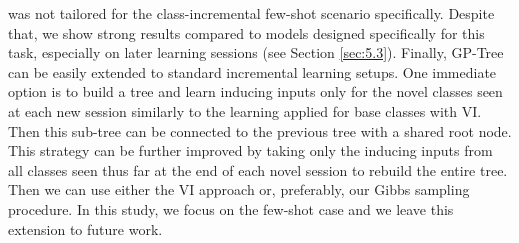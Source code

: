 \documentclass[preprint,11pt]{elsarticle}
\begin{document}
        was not tailored for the class-incremental few-shot scenario
        specifically. Despite that, we show strong results compared
        to models designed specifically for this task, especially on
        later learning sessions (see Section \ref{sec:5.3}). Finally, GP-Tree
        can be easily extended to standard incremental learning
        setups. One immediate option is to build a tree and learn
        inducing inputs only for the novel classes seen at each new
        session similarly to the learning applied for base classes
        with VI. Then this sub-tree can be connected to the previous
        tree with a shared root node. This strategy can be further
        improved by taking only the inducing inputs from all classes
        seen thus far at the end of each novel session to rebuild the
        entire tree. Then we can use either the VI approach or,
        preferably, our Gibbs sampling procedure. In this study, we
        focus on the few-shot case and we leave this extension to
        future work.
\end{document}

